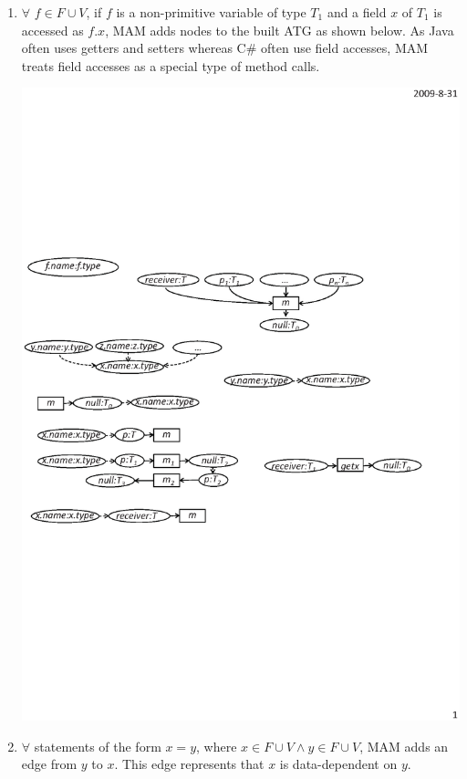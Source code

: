\begin{enumerate}
\item $\forall$ $f\in F \cup V$, if $f$ is a non-primitive variable
of type $T_1$ and a field $x$ of $T_1$ is accessed as $f.x$, MAM adds nodes to the built ATG as shown below. As Java often
uses getters and setters whereas C\# often use field accesses, MAM treats field accesses as a special type of method
calls.\vspace*{-2ex}

\begin{center}
\includegraphics[scale=0.7,clip]{figure/rule3.eps}%
\end{center}\vspace*{-3ex}

\item $\forall$ statements of the form $x = y$, where $x \in F \cup V \wedge y \in F \cup V$,
MAM adds an edge from $y$ to $x$. This edge represents that
$x$ is data-dependent on $y$.\vspace*{-1.5ex}


\end{enumerate}
